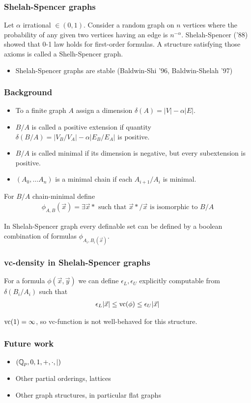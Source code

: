\documentclass{beamer}
\begin{document}
\begin{frame}
	\frametitle{Shelah-Spencer graphs}
	Let $\alpha$ irrational $\in (0,1)$. Consider a random graph on $n$ vertices where the probability of any given two vertices having an edge is $n^{-\alpha}$. Shelah-Spencer ('88) showed that 0-1 law holds for first-order formulas. A structure satisfying those axioms is called a Shelh-Spencer graph.
	\begin{itemize}
		\item Shelah-Spencer graphs are stable (Baldwin-Shi '96, Baldwin-Shelah '97)
	\end{itemize}
\end{frame}

\begin{frame}
	\frametitle{Background}
\begin{Definition}
	\begin{itemize}
		\item To a finite graph $A$ assign a dimension $\delta(A) = |V| - \alpha |E|$.
		\item $B/A$ is called a positive extension if quantity $\delta(B/A) = |V_B/V_A| - \alpha |E_B/E_A|$ is positive.
		\item $B/A$ is called minimal if its dimension is negative, but every subextension is positive.
		\item $(A_0, \ldots A_n)$ is a minimal chain if each $A_{i + 1}/A_i$ is minimal.
	\end{itemize}
\end{Definition}
	For $B/A$ chain-minimal define
	\begin{align*}
		\phi_{A,B}(\vec x) = \exists \vec x* \text { such that $\vec x*/\vec x$ is isomorphic to $B/A$}
	\end{align*}
	\begin{Theorem} 
		In Shelah-Spencer graph every definable set can be defined by a boolean combination of formulas $\phi_{A_i, B_i(\vec x)}$.
	\end{Theorem}
\end{frame}

\begin{frame}
	\frametitle{vc-density in Shelah-Spencer graphs}
	\begin{Theorem} [B., '15]
		For a formula $\phi(\vec x, \vec y)$ we can define $\epsilon_L, \epsilon_U$ explicitly computable from $\delta(B_i/A_i)$ such that
			\begin{align*}
				\epsilon_L |\vec x| \leq \operatorname{vc}(\phi) \leq \epsilon_U |\vec x|
			\end{align*}
	\end{Theorem}
	\begin{Corollary}
		$\operatorname{vc}(1) = \infty$, so vc-function is not well-behaved for this structure.
	\end{Corollary}
\end{frame}

\begin{frame}
	\frametitle{Future work}
	\begin{itemize}
		\item $(\mathbb{Q}_p, 0, 1, +, \cdot, \mid)$
		\item Other partial orderings, lattices
		\item Other graph structures, in particular flat graphs
	\end{itemize}
\end{frame}
\end{document}
